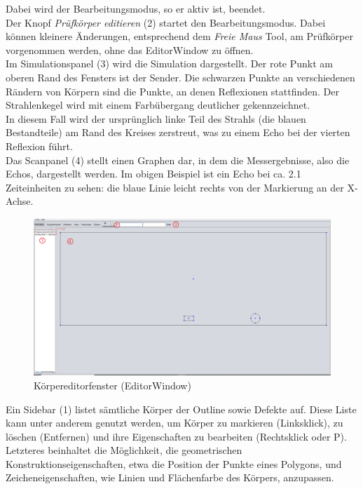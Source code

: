 \documentclass[reducespace,stylepage,semiarbeit]{spezidoc}
\begin{document}
Dabei wird der Bearbeitungsmodus, so er aktiv ist, beendet.\\
Der Knopf \textit{Prüfkörper editieren} (2) startet den Bearbeitungsmodus. 
Dabei können kleinere Änderungen, entsprechend dem \textit{Freie Maus} Tool, am Prüfkörper vorgenommen werden,  ohne das EditorWindow zu öffnen.\\
Im Simulationspanel (3) wird die Simulation dargestellt. 
Der rote Punkt am oberen Rand des Fensters ist der Sender. 
Die schwarzen Punkte an verschiedenen Rändern von Körpern sind die Punkte, an denen Reflexionen stattfinden. 
Der Strahlenkegel wird mit einem Farbübergang deutlicher gekennzeichnet.\\
In diesem Fall wird der ursprünglich linke Teil des Strahls (die blauen Bestandteile) am Rand des Kreises zerstreut, was zu einem Echo bei der vierten Reflexion führt.\\
Das Scanpanel (4) stellt einen Graphen dar, in dem die Messergebnisse, also die Echos, dargestellt werden. 
Im obigen Beispiel ist ein Echo bei ca. 2.1 Zeiteinheiten zu sehen: die blaue Linie leicht rechts von der Markierung an der X-Achse.\\
\newpage %
\begin{figure}[h]
\centering
\includegraphics[scale=0.315]{pictures/EditorWindow.png}
\caption{Körpereditorfenster (EditorWindow)}
\end{figure}
Ein Sidebar (1) listet sämtliche Körper der Outline sowie Defekte auf. 
Diese Liste kann unter anderem genutzt werden, um Körper zu markieren (Linksklick), zu löschen (Entfernen) und ihre Eigenschaften zu bearbeiten (Rechtsklick oder P).\\
Letzteres beinhaltet die Möglichkeit, die geometrischen Konstruktionseigenschaften, etwa die Position der Punkte eines Polygons, und Zeicheneigenschaften, wie Linien und Flächenfarbe des Körpers, anzupassen.\\
\end{document}
